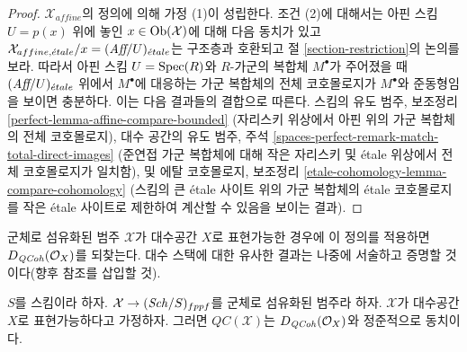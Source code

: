 \begin{proof}
 $\mathcal{X}_{affine}$의 정의에 의해 가정 (1)이 성립한다.
조건 (2)에 대해서는 아핀 스킴 $U = p(x)$ 위에 놓인
$x \in \mathop{\mathrm{Ob}}\nolimits(\mathcal{X})$에 대해 다음 동치가 있고
$\mathcal{X}_{affine, {\acute{e}tale}}/x = (\textit{Aff}/U)_{\acute{e}tale}$는 구조층과 호환되고
절 \ref{section-restriction}의 논의를 보라.
따라서 아핀 스킴 $U = \mathop{\mathrm{Spec}}(R)$와 $R$-가군의 복합체 $M^\bullet$가
주어졌을 때 $(\textit{Aff}/U)_{\acute{e}tale}$ 위에서 $M^\bullet$에 대응하는
가군 복합체의 전체 코호몰로지가 $M^\bullet$와 준동형임을 보이면 충분하다.
이는 다음 결과들의 결합으로 따른다.
스킴의 유도 범주, 보조정리
\ref{perfect-lemma-affine-compare-bounded} (자리스키 위상에서 아핀 위의
가군 복합체의 전체 코호몰로지), 대수 공간의 유도 범주, 주석
\ref{spaces-perfect-remark-match-total-direct-images}
(준연접 가군 복합체에 대해 작은 자리스키 및 \'etale 위상에서 전체
코호몰로지가 일치함), 및 에탈 코호몰로지, 보조정리
\ref{etale-cohomology-lemma-compare-cohomology} (스킴의 큰 \'etale
사이트 위의 가군 복합체의 \'etale 코호몰로지를 작은 \'etale 사이트로
제한하여 계산할 수 있음을 보이는 결과).
\end{proof}

\noindent
군체로 섬유화된 범주 $\mathcal{X}$가 대수공간 $X$로 표현가능한 경우에
이 정의를 적용하면 $D_{\mathit{QCoh}}(\mathcal{O}_X)$를 되찾는다. 대수 스택에
대한 유사한 결과는 나중에 서술하고 증명할 것이다(향후 참조를 삽입할 것).

\begin{proposition}
\label{proposition-QC-compare}
$S$를 스킴이라 하자. $\mathcal{X} \to (\mathit{Sch}/S)_{fppf}$를 군체로
섬유화된 범주라 하자. $\mathcal{X}$가 대수공간 $X$로 표현가능하다고
가정하자. 그러면 $\mathit{QC}(\mathcal{X})$는
$D_{\mathit{QCoh}}(\mathcal{O}_X)$와 정준적으로 동치이다.
\end{proposition}

